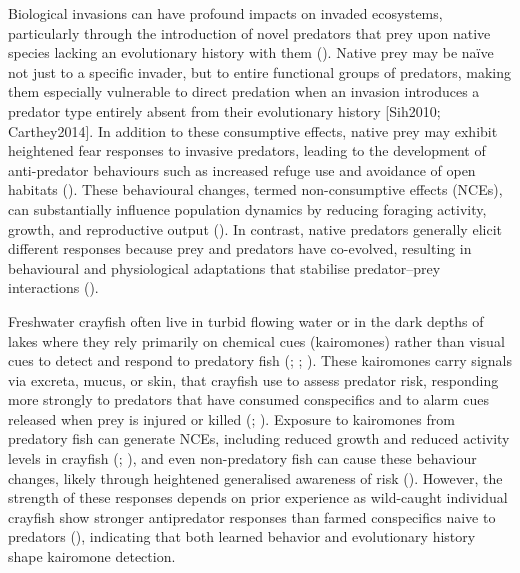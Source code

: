 \documentclass[
  letterpaper,
  DIV=11,
  numbers=noendperiod]{scrartcl}
\begin{document}
Biological invasions can have profound impacts on invaded ecosystems,
particularly through the introduction of novel predators that prey upon
native species lacking an evolutionary history with them
(). Native prey may be
naïve not just to a specific invader, but to entire functional groups of
predators, making them especially vulnerable to direct predation when an
invasion introduces a predator type entirely absent from their
evolutionary history {[}Sih2010; Carthey2014{]}. In addition to these
consumptive effects, native prey may exhibit heightened fear responses
to invasive predators, leading to the development of anti-predator
behaviours such as increased refuge use and avoidance of open habitats
(). These
behavioural changes, termed non-consumptive effects (NCEs), can
substantially influence population dynamics by reducing foraging
activity, growth, and reproductive output
(). In contrast,
native predators generally elicit different responses because prey and
predators have co-evolved, resulting in behavioural and physiological
adaptations that stabilise predator--prey interactions
().

Freshwater crayfish often live in turbid flowing water or in the dark
depths of lakes where they rely primarily on chemical cues (kairomones)
rather than visual cues to detect and respond to predatory fish
(;
;
). These kairomones carry
signals via excreta, mucus, or skin, that crayfish use to assess
predator risk, responding more strongly to predators that have consumed
conspecifics and to alarm cues released when prey is injured or killed
(;
). Exposure to
kairomones from predatory fish can generate NCEs, including reduced
growth and reduced activity levels in crayfish
(;
), and
even non-predatory fish can cause these behaviour changes, likely
through heightened generalised awareness of risk
(). However, the strength of
these responses depends on prior experience as wild-caught individual
crayfish show stronger antipredator responses than farmed conspecifics
naive to predators (), indicating
that both learned behavior and evolutionary history shape kairomone
detection.
\end{document}
